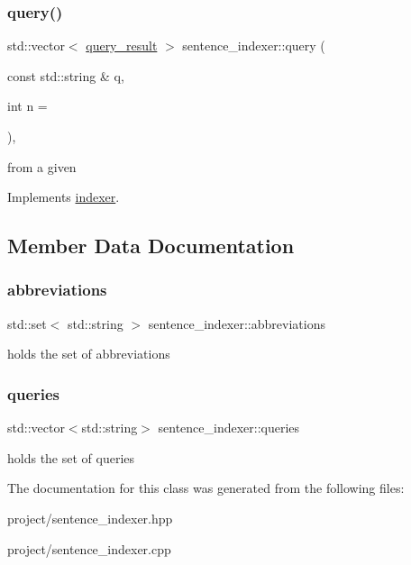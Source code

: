\subsubsection{\texorpdfstring{query()}{query()}}
{\footnotesize\ttfamily std\+::vector$<$ \hyperlink{classquery__result}{query\+\_\+result} $>$ sentence\+\_\+indexer\+::query (\begin{DoxyParamCaption}\item[{const std\+::string \&}]{q,  }\item[{int}]{n = {} }\end{DoxyParamCaption})\hspace{0.3cm}{\ttfamily [override]}, {\ttfamily [virtual]}}

from a given 

Implements \hyperlink{classindexer}{indexer}.



\subsection{Member Data Documentation}
\mbox{\label{classsentence__indexer_abdcbe72e9fa681c5a59f4cfeb5c9dcbc}} 
\subsubsection{\texorpdfstring{abbreviations}{abbreviations}}
{\footnotesize\ttfamily std\+::set$<$ std\+::string $>$ sentence\+\_\+indexer\+::abbreviations\hspace{0.3cm}{\ttfamily [static]}}

holds the set of abbreviations \mbox{\label{classsentence__indexer_af3c7b09486d9cdfb49d6ebf7be6623c6}} 
\subsubsection{\texorpdfstring{queries}{queries}}
{\footnotesize\ttfamily std\+::vector$<$std\+::string$>$ sentence\+\_\+indexer\+::queries}

holds the set of queries 

The documentation for this class was generated from the following files\+:\begin{DoxyCompactItemize}
\item 
project/sentence\+\_\+indexer.\+hpp\item 
project/sentence\+\_\+indexer.\+cpp\end{DoxyCompactItemize}
